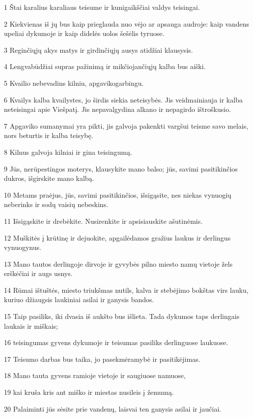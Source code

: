 \par 1 Štai karalius karaliaus teisume ir kunigaikščiai valdys teisingai. 
\par 2 Kiekvienas iš jų bus kaip prieglauda nuo vėjo ar apsauga audroje: kaip vandens upeliai dykumoje ir kaip didelės uolos šešėlis tyruose. 
\par 3 Reginčiųjų akys matys ir girdinčiųjų ausys atidžiai klausysis. 
\par 4 Lengvabūdžiai supras pažinimą ir mikčiojančiųjų kalba bus aiški. 
\par 5 Kvailio nebevadins kilniu, apgaviko­garbingu. 
\par 6 Kvailys kalba kvailystes, jo širdis siekia neteisybės. Jis veidmainiauja ir kalba neteisingai apie Viešpatį. Jis nepavalgydina alkano ir nepagirdo ištroškusio. 
\par 7 Apgaviko sumanymai yra pikti, jis galvoja pakenkti vargšui teisme savo melais, nors beturtis ir kalba teisybę. 
\par 8 Kilnus galvoja kilniai ir gina teisingumą. 
\par 9 Jūs, nerūpestingos moterys, klausykite mano balso; jūs, savimi pasitikinčios dukros, išgirskite mano kalbą. 
\par 10 Metams praėjus, jūs, savimi pasitikinčios, išsigąsite, nes niekas vynuogių neberinks ir sodų vaisių nebeskins. 
\par 11 Išsigąskite ir drebėkite. Nusirenkite ir apsisiauskite ašutinėmis. 
\par 12 Muškitės į krūtinę ir dejuokite, apgailėdamos gražius laukus ir derlingus vynuogynus. 
\par 13 Mano tautos derlingoje dirvoje ir gyvybės pilno miesto namų vietoje žels erškėčiai ir augs usnys. 
\par 14 Rūmai ištuštės, miesto triukšmas nutils, kalva ir stebėjimo bokštas virs lauku, kuriuo džiaugsis laukiniai asilai ir ganysis bandos. 
\par 15 Taip pasiliks, iki dvasia iš aukšto bus išlieta. Tada dykumos taps derlingais laukais ir miškais; 
\par 16 teisingumas gyvens dykumoje ir teisumas pasiliks derlinguose laukuose. 
\par 17 Teisumo darbas bus taika, jo pasekmė­ramybė ir pasitikėjimas. 
\par 18 Mano tauta gyvens ramioje vietoje ir saugiuose namuose, 
\par 19 kai kruša kris ant miško ir miestas nusileis į žemumą. 
\par 20 Palaiminti jūs sėsite prie vandenų, laisvai ten ganysis asilai ir jaučiai.



